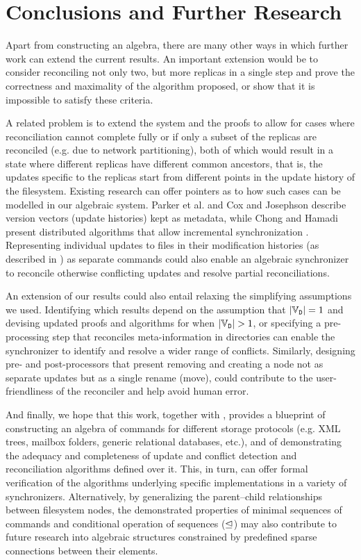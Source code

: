 
\section{Conclusions and Further Research}

Apart from constructing an algebra,
there are many other ways in which further work can extend the current results.
An important extension would be to
consider reconciling not only two, but more replicas in a single step and
prove the correctness and maximality of the algorithm proposed,
or show that it is impossible to satisfy these criteria.

A related problem is to extend the system and the proofs
to allow for cases where reconciliation cannot
complete fully
or if only a subset of the replicas are reconciled 
(e.g. due to network partitioning),
both of which would result in a state where different replicas
have different common ancestors, that is,
the updates specific to the replicas start from different points
in the update history of the filesystem.
Existing research can offer pointers as to how such cases can be modelled
in our algebraic system.
Parker et al. \cite{PPRS} and Cox and Josephson \cite{CJ}
describe version vectors (update histories) kept as metadata,
while Chong and Hamadi present distributed algorithms that allow incremental synchronization \cite{CH}.
Representing individual updates to files
in their modification histories (as described in \cite{CJ})
as separate commands could also enable an algebraic synchronizer to reconcile otherwise
conflicting updates and resolve partial reconciliations.

An extension of our results could also entail relaxing
the simplifying assumptions we used.
Identifying which results depend on the assumption that $|\mathbb{V}_{\mathtt{D}}|=1$
and devising updated proofs and algorithms for when $|\setd|>1$,
or specifying a pre-processing step that reconciles meta-information in directories
can enable the synchronizer
to identify and resolve a wider range of conflicts.
Similarly, designing pre- and post-processors that
present removing and creating a node
not as separate updates but as a single rename (move),
could contribute to the user-friendliness of the reconciler
and help avoid human error.

And finally, we hope that this work, together with \cite{NREC}, provides
a blueprint of constructing an algebra of commands for different storage protocols
(e.g. XML trees, mailbox folders, generic relational databases, etc.),
and of demonstrating the adequacy and completeness of update and conflict detection and reconciliation
algorithms defined over it.
This, in turn, can offer formal verification of the algorithms underlying
specific implementations in a variety of synchronizers.
Alternatively, by generalizing the parent--child relationships between filesystem nodes,
the demonstrated properties of minimal sequences of commands
and conditional operation of sequences ($\trianglelefteq$) %
may also contribute to future research into algebraic structures
constrained by predefined sparse connections between their elements.
